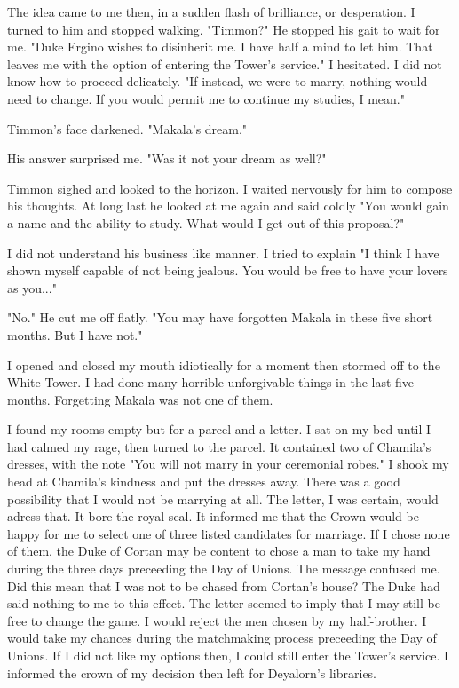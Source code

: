 \documentclass{article}
\begin{document}
The idea came to me then, in a sudden flash of brilliance, or desperation. I turned to him and stopped walking. "Timmon?" He stopped his gait to wait for me. "Duke Ergino wishes to disinherit me. I have half a mind to let him. That leaves me with the option of entering the Tower's service." I hesitated. I did not know how to proceed delicately. "If instead, we were to marry, nothing would need to change. If you would permit me to continue my studies, I mean."

Timmon's face darkened. "Makala's dream."

His answer surprised me. "Was it not your dream as well?"

Timmon sighed and looked to the horizon. I waited nervously for him to compose his thoughts. At long last he looked at me again and said coldly "You would gain a name and the ability to study. What would I get out of this proposal?"

I did not understand his business like manner. I tried to explain "I think I have shown myself capable of not being jealous. You would be free to have your lovers as you..."

"No." He cut me off flatly. "You may have forgotten Makala in these five short months. But I have not."

I opened and closed my mouth idiotically for a moment then stormed off to the White Tower. I had done many horrible unforgivable things in the last five months. Forgetting Makala was not one of them.

\vspace{.5cm}

I found my rooms empty but for a parcel and a letter. I sat on my bed until I had calmed my rage, then turned to the parcel. It contained two of Chamila's dresses, with the note "You will not marry in your ceremonial robes." I shook my head at Chamila's kindness and put the dresses away. There was a good possibility that I would not be marrying at all. The letter, I was certain, would adress that. It bore the royal seal. It informed me that the Crown would be happy for me to select one of three listed candidates for marriage. If I chose none of them, the Duke of Cortan may be content to chose  a man to take my hand during the three days preceeding the Day of Unions. The message confused me. Did this mean that I was not to be chased from Cortan's house? The Duke had said nothing to me to this effect. The letter seemed to imply that I may still be free to change the game. I would reject the men chosen by my half-brother. I would take my chances during the matchmaking process preceeding the Day of Unions. If I did not like my options then, I could still enter the Tower's service. I informed the crown of my decision then left for Deyalorn's libraries.
\end{document}
